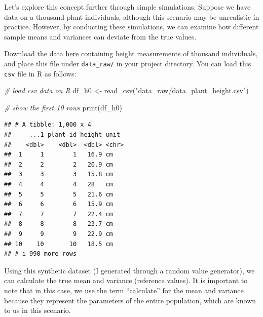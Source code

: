 \documentclass[
]{article}
\newenvironment{Shaded}{\begin{snugshade}}{\end{snugshade}}
\newcommand{\CommentTok}[1]{\textcolor[rgb]{0.56,0.35,0.01}{\textit{#1}}}
\newcommand{\DecValTok}[1]{\textcolor[rgb]{0.00,0.00,0.81}{#1}}
\newcommand{\FunctionTok}[1]{\textcolor[rgb]{0.00,0.00,0.00}{#1}}
\newcommand{\NormalTok}[1]{#1}
\newcommand{\OtherTok}[1]{\textcolor[rgb]{0.56,0.35,0.01}{#1}}
\newcommand{\SpecialCharTok}[1]{\textcolor[rgb]{0.00,0.00,0.00}{#1}}
\newcommand{\StringTok}[1]{\textcolor[rgb]{0.31,0.60,0.02}{#1}}
\begin{document}
Let's explore this concept further through simple simulations. Suppose we have data on a thousand plant individuals, although this scenario may be unrealistic in practice. However, by conducting these simulations, we can examine how different sample means and variances can deviate from the true values.

Download the data \href{https://github.com/aterui/biostats/blob/master/data_raw/data_plant_height.csv}{here} containing height measurements of thousand individuals, and place this file under \texttt{data\_raw/} in your project directory. You can load this \texttt{csv} file in R as follows:

\begin{Shaded}
\begin{Highlighting}[]
\CommentTok{\# load csv data on R}
\NormalTok{df\_h0 }\OtherTok{\textless{}{-}} \FunctionTok{read\_csv}\NormalTok{(}\StringTok{"data\_raw/data\_plant\_height.csv"}\NormalTok{)}

\CommentTok{\# show the first 10 rows}
\FunctionTok{print}\NormalTok{(df\_h0)}
\end{Highlighting}
\end{Shaded}

\begin{verbatim}
## # A tibble: 1,000 x 4
##     ...1 plant_id height unit 
##    <dbl>    <dbl>  <dbl> <chr>
##  1     1        1   16.9 cm   
##  2     2        2   20.9 cm   
##  3     3        3   15.8 cm   
##  4     4        4   28   cm   
##  5     5        5   21.6 cm   
##  6     6        6   15.9 cm   
##  7     7        7   22.4 cm   
##  8     8        8   23.7 cm   
##  9     9        9   22.9 cm   
## 10    10       10   18.5 cm   
## # i 990 more rows
\end{verbatim}

Using this synthetic dataset (I generated through a random value generator), we can calculate the true mean and variance (reference values). It is important to note that in this case, we use the term ``calculate'' for the mean and variance because they represent the parameters of the entire population, which are known to us in this scenario.

\begin{Shaded}
\end{Shaded}
\end{document}
